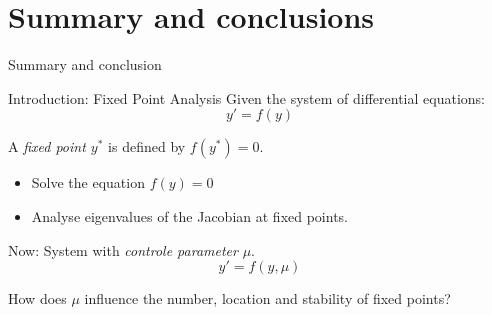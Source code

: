 \documentclass{beamer}
\begin{document}
\section{Summary and conclusions}
\begin{frame}{Summary and conclusion}
\end{frame}
\begin{frame}{Introduction: Fixed Point Analysis}
    Given the system of differential equations:
    $$y' = f(y) $$
    \begin{definition}
        A \emph{fixed point $y^*$} is defined by $f(y^*)=0$.
    \end{definition}
    \begin{itemize}
        \item Solve the equation $f(y) = 0$ 
        \item Analyse eigenvalues of the Jacobian at fixed points.
    \end{itemize}
    Now: System with \emph{controle parameter} $\mu$. 
    $$y' = f(y, \mu)$${}    
    \begin{block}{}
        How does $\mu$ influence the number, location and stability of fixed points?
    \end{block}
\end{frame}
\end{document}
